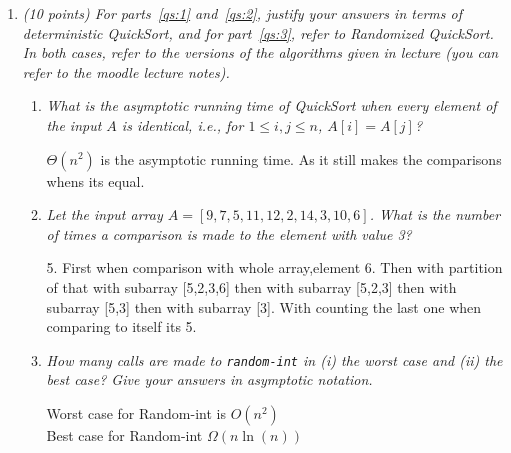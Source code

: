 \documentclass[12pt]{article}
\begin{document}
\renewcommand{\headrulewidth}{0.4pt}


\begin{enumerate}

	\item \textit{(10 points) For parts~\eqref{qs:1} and~\eqref{qs:2}, justify your answers in terms of deterministic QuickSort, and for part~\eqref{qs:3}, refer to Randomized QuickSort. In both cases, refer to the versions of the algorithms given in lecture (you can refer to the moodle lecture notes).}
	\begin{enumerate}
	\item\textit{ \label{qs:1} What is the asymptotic running time of QuickSort when every element of the input $A$ is identical, i.e., for $1\leq i,j \leq n$, $A[i] = A[j]$?}

$\Theta(n^2)$ is the asymptotic running time. As it still makes the comparisons whens its equal.
	\item\textit{ \label{qs:2} Let the input array $A = [9, 7, 5, 11, 12, 2, 14, 3, 10, 6]$. What is the number of times a comparison is made to the element with value 3?}

5. First when comparison with whole array,element 6. Then with partition of that with subarray [5,2,3,6] then with subarray [5,2,3] then with subarray [5,3] then with subarray [3]. With counting the last one when comparing to itself its 5.

	\item\textit{ \label{qs:3} How many calls are made to {\tt random-int} in (i) the worst case and (ii) the best case? Give your answers in asymptotic notation.}

Worst case for Random-int is $O(n^2)$\\
Best case for Random-int $\Omega(n\ln(n))$
	\end{enumerate}



	\newpage


\end{enumerate}
\end{document}
